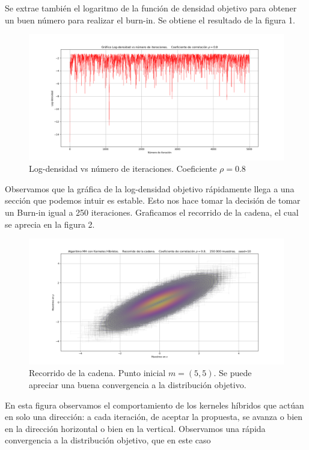 \documentclass[letterpaper]{article}
\newcommand{\1}{\mathds{1}}
\theoremstyle{definition}
\theoremstyle{definition}
\theoremstyle{definition}
\theoremstyle{definition}
\theoremstyle{definition}
\begin{document}
\begin{itemize}
    Se extrae también el logaritmo de la función de densidad objetivo para obtener un buen 
    número para realizar el burn-in. Se obtiene el resultado de la figura 1.
    \begin{figure}[h!]
        \centering
        \includegraphics[width=\linewidth]{1.png}
        \caption{Log-densidad vs número de iteraciones. Coeficiente $\rho=0.8$}
    \end{figure} 
    Observamos que la gráfica de la log-densidad objetivo rápidamente llega a una sección que podemos intuir es estable. Esto nos hace tomar la decisión de 
    tomar un Burn-in igual a 250 iteraciones. Graficamos el recorrido de la cadena, el cual se aprecia en la figura 2.
    \begin{figure}[h!]
        \centering
        \includegraphics[width=\linewidth]{2.png}
        \caption{Recorrido de la cadena. Punto inicial $m=(5,5)$. Se puede apreciar una buena convergencia a la distribución objetivo.}
    \end{figure} 
    En esta figura observamos el comportamiento de los kerneles híbridos que actúan en solo una dirección: a cada iteración, de aceptar la 
    propuesta, se avanza o bien en la dirección horizontal o bien en la vertical. Observamos una rápida convergencia a la distribución objetivo, que en este caso

\end{itemize}
\end{document}
